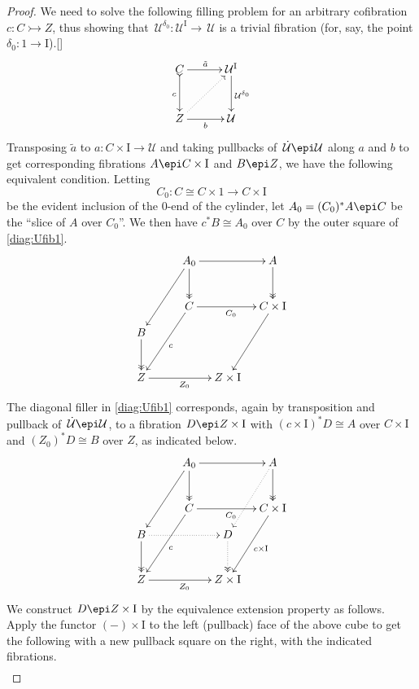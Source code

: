 \documentclass[12pt]{article}
\newcommand{\ednote}[1]{[\textit{\color{red}{#1}}]} %
\newcommand{\ra}{\ensuremath{\rightarrow}}
\newcommand{\cof}{\ensuremath{\rightarrowtail}}
\newcommand{\fib}{\ensuremath{\epi}}
\newcommand{\I}{\ensuremath{\mathrm{I}}}
\newcommand{\U}{\ensuremath{\mathcal{U}}}
\newcommand{\UU}{\ensuremath{\,\dot{\mathcal{U}}}}
\theoremstyle{remark}
\theoremstyle{definition}
\begin{document}
\begin{proof}
We need to solve the following filling problem for an arbitrary cofibration $c:C \cof Z$, thus showing that $\,\U^{\delta_0} : \U^\I \ra\, \U$ is a trivial fibration (for, say, the point $\delta_0 :1\ra \I $).\ednote{say something about using $\delta_0$}
\begin{equation}\label{diag:Ufib1}
\xymatrix@=3em{
C \ar@{>->}[d]_c \ar[r]^{\tilde{a}} & \U^\I \ar[d]^{\U^{\delta_0}} \\
Z  \ar@{..>}[ru] \ar[r]_{b}  & \U  \\
}
\end{equation}
Transposing $\tilde{a}$ to $a : C\times \I \ra \U$ and taking pullbacks of $\UU\fib \U$ along $a$ and $b$ to get  corresponding fibrations $A\fib C\times \I$ and $B\fib Z$, we have the following equivalent condition.  Letting $$C_0 : C\cong C\times1 \ra C\times \I$$ be the evident inclusion of the $0$-end of the cylinder, let $A_0 = (C_0)^*A \fib C$ be the ``slice of $A$ over $C_0$''.  We then have $c^*B \cong A_0$ over $C$ by the outer square of \eqref{diag:Ufib1}.
\[
\xymatrix@=1em{
&& \ar[llddd] A_0 \ar@{->>}[dd] \ar[rr]  &&  A \ar@{->>}[dd] \\
&& && \\
&& \ar[llddd]^c C \ar[rr]_{C_0}  &&  \ar[lddd] C\times\I \\
B \ar@{->>}[dd] &&&& \\
&&&& \\
Z \ar[rrr]_{Z_0} &&& Z\times\I &
}
\]
The diagonal filler in \eqref{diag:Ufib1} corresponds, again by transposition and pullback of $\UU\fib\U$, to a fibration $D\fib Z\times \I$ with $(c\times \I)^*D \cong A$ over $C\times \I$
 and $(Z_0)^*D \cong B$ over $Z$, as indicated below.
\[
\xymatrix@=1em{
&& \ar[llddd] A_0 \ar@{->>}[dd] \ar[rr]  &&  \ar@{..>}[lddd] A \ar@{->>}[dd] \\
&& && \\
&& \ar[llddd]^c C \ar[rr]_{C_0}  &&  \ar[lddd]^{c\times\I} C\times\I \\
B \ar@{->>}[dd] \ar@{..>}[rrr] &&& D \ar@{..>>}[dd] & \\
&&&& \\
Z \ar[rrr]_{Z_0} &&& Z\times\I &
}
\]
We construct $D\fib Z\times \I$ by the equivalence extension property as follows.  Apply the functor $(-)\times\I$ to the left (pullback) face of the above cube to get the following with a new pullback square on the right, with the indicated fibrations.
\begin{equation}\label{diag:Ufib2}
\begin{gathered}

\end{gathered}
\end{equation}
\end{proof}
\end{document}
